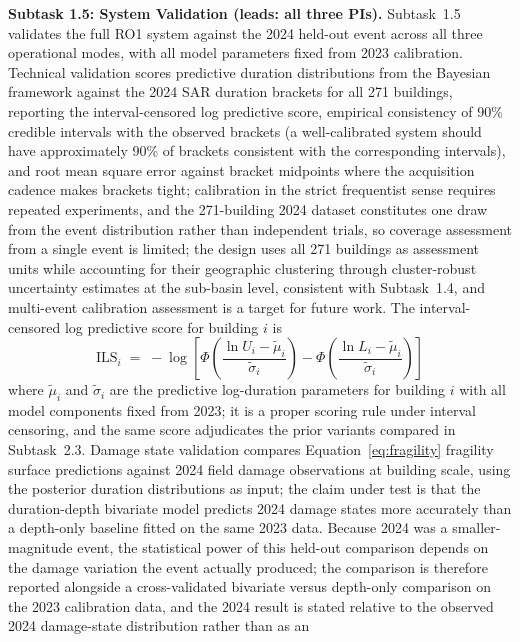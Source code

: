 \documentclass[11pt]{article}
\begin{document}
\textbf{Subtask 1.5: System Validation (leads: all three PIs).}
Subtask~1.5 validates the full RO1 system against the 2024 held-out event across
all three operational modes, with all model parameters fixed from 2023 calibration.
Technical validation scores predictive duration distributions from the Bayesian
framework against the 2024 SAR duration brackets for all 271 buildings, reporting
the interval-censored log predictive score, empirical consistency of 90\% credible
intervals with the observed brackets (a well-calibrated system should have
approximately 90\% of brackets consistent with the corresponding intervals), and
root mean square error against bracket midpoints where the acquisition cadence
makes brackets tight; calibration in the strict
frequentist sense requires repeated experiments, and the 271-building 2024 dataset
constitutes one draw from the event distribution rather than independent trials,
so coverage assessment from a single event is limited; the design uses all 271
buildings as assessment units while accounting for their geographic clustering
through cluster-robust uncertainty estimates at the sub-basin level, consistent
with Subtask~1.4, and multi-event calibration assessment is a target for future work.
The interval-censored log predictive score for building $i$ is
\begin{equation}\label{eq:lps}
  \mathrm{ILS}_i \;=\; -\log\!\left[
    \Phi\!\left(\frac{\ln U_i - \tilde{\mu}_i}{\tilde{\sigma}_i}\right) -
    \Phi\!\left(\frac{\ln L_i - \tilde{\mu}_i}{\tilde{\sigma}_i}\right)\right]
\end{equation}
where $\tilde{\mu}_i$ and $\tilde{\sigma}_i$ are the predictive log-duration
parameters for building $i$ with all model components fixed from 2023; it is a
proper scoring rule under interval censoring, and the same score adjudicates the
prior variants compared in Subtask~2.3.
Damage state validation compares Equation~\eqref{eq:fragility} fragility surface predictions against
2024 field damage observations at building scale, using the posterior duration
distributions as input; the claim under test is that the duration-depth bivariate
model predicts 2024 damage states more accurately than a depth-only baseline fitted
on the same 2023 data.
Because 2024 was a smaller-magnitude event, the statistical power of this held-out
comparison depends on the damage variation the event actually produced; the
comparison is therefore reported alongside a cross-validated bivariate versus
depth-only comparison on the 2023 calibration data, and the 2024 result is stated
relative to the observed 2024 damage-state distribution rather than as an
\end{document}
